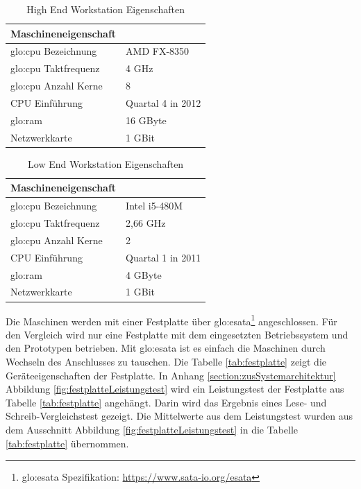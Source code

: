 \begin{table}[ht]
	\centering
		\begin{tabular}{@{}ll@{}} \toprule
			\textbf{Maschineneigenschaft} &  \\ \midrule
			\gls{glo:cpu} Bezeichnung & AMD FX-8350 \\
			\gls{glo:cpu} Taktfrequenz & 4 GHz \\
			\gls{glo:cpu} Anzahl Kerne & 8 \\
			CPU Einführung & Quartal 4 in 2012 \\
			\gls{glo:ram} & 16 GByte \\
			Netzwerkkarte & 1 GBit \\
			\bottomrule			
		\end{tabular}
	\caption{High End Workstation Eigenschaften}
	\label{tab:hiendwork}
\end{table}

\begin{table}[ht]
	\centering
		\begin{tabular}{@{}ll@{}} \toprule
			\textbf{Maschineneigenschaft} &  \\ \midrule
			\gls{glo:cpu} Bezeichnung & Intel i5-480M \\
			\gls{glo:cpu} Taktfrequenz & 2,66 GHz \\
			\gls{glo:cpu} Anzahl Kerne & 2 \\
			CPU Einführung & Quartal 1 in 2011 \\
			\gls{glo:ram} & 4 GByte \\
			Netzwerkkarte & 1 GBit \\
			\bottomrule			
		\end{tabular}
	\caption{Low End Workstation Eigenschaften}
	\label{tab:loendwork}
\end{table}

Die Maschinen werden mit einer Festplatte über \gls{glo:esata}\footnote{\gls{glo:esata} Spezifikation: \url{https://www.sata-io.org/esata}} angeschlossen. Für den Vergleich wird nur eine Festplatte mit dem eingesetzten Betriebssystem und den Prototypen betrieben. Mit \gls{glo:esata} ist es einfach die Maschinen durch Wechseln des Anschlusses zu tauschen. Die Tabelle \ref{tab:festplatte} zeigt die Geräteeigenschaften der Festplatte. In Anhang \ref{section:zusSystemarchitektur} Abbildung \ref{fig:festplatteLeistungstest} wird ein Leistungstest der Festplatte aus Tabelle \ref{tab:festplatte} angehängt. Darin wird das Ergebnis eines Lese- und Schreib-Vergleichstest gezeigt. Die Mittelwerte aus dem Leistungstest wurden aus dem Ausschnitt Abbildung \ref{fig:festplatteLeistungstest} in die Tabelle \ref{tab:festplatte} übernommen.

